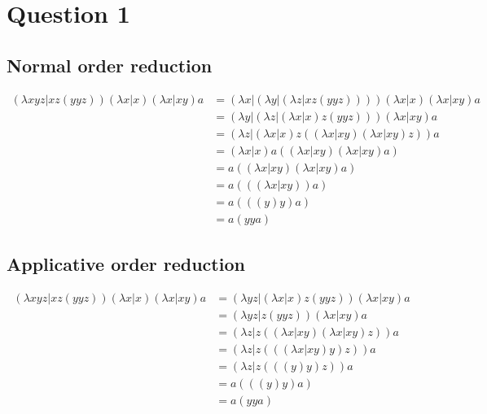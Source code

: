 \documentclass[8pt, letterpaper, titlepage]{article}
\title{\textbf{\Huge{ 
\begin{center}
MATE 201\\ \large{Class notes} %
\end{center} 
}}}
\author{Lora Ma}
\begin{document}
\section*{Question 1}
\subsection*{Normal order reduction}
\begin{align}
  (\lambda xyz | xz(yyz))(\lambda x | x)(\lambda x | xy) a &= (\lambda x | (\lambda y | (\lambda z | xz(yyz))))(\lambda x | x)(\lambda x | xy)a \\
  &= (\lambda y | (\lambda z | (\lambda x|x)z(yyz)))(\lambda x | xy) a \\
  &= (\lambda z | (\lambda x | x) z ((\lambda x | xy)(\lambda x | x y) z))a \\
  &= (\lambda x | x)a((\lambda x|xy)(\lambda x|xy) a) \\
  &= a((\lambda x | xy)(\lambda x | xy) a) \\
  &= a(((\lambda x | xy) )a) \\
  &= a(((y)y)a) \\
  &= a(yya)
\end{align}
\subsection*{Applicative order reduction}
\begin{align}
  (\lambda xyz | xz(yyz))(\lambda x | x)(\lambda x | xy) a &=  (\lambda yz | (\lambda x | x) z(yyz))(\lambda x | xy) a \\
  &= (\lambda yz | z(yyz))(\lambda x | xy) a \\
  &= (\lambda z | z((\lambda x | xy)(\lambda x | xy)z)) a \\
  &= (\lambda z | z(((\lambda x | xy)y)z)) a \\
  &= (\lambda z | z(((y)y)z)) a \\
  &= a(((y)y)a) \\
  &= a(yya)
\end{align}
\end{document}
